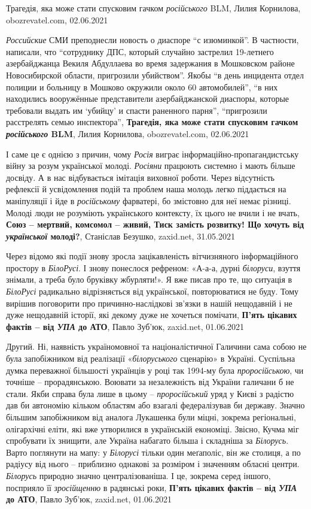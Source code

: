 Трагедія, яка може стати спусковим гачком \emph{російського} BLM, Лилия Корнилова, obozrevatel.com, 02.06.2021

\emph{Российские} СМИ преподнесли новость о диаспоре \enquote{с изюминкой}. В
частности, написали, что \enquote{сотруднику ДПС, который случайно застрелил
19-летнего азербайджанца Векиля Абдуллаева во время задержания в Мошковском
районе Новосибирской области, пригрозили убийством}.  Якобы \enquote{в день
инцидента отдел полиции и больницу в Мошково окружили около 60 автомобилей},
\enquote{в них находились вооружённые представители азербайджанской диаспоры,
которые требовали выдать им \enquote{убийцу} и спасти раненного парня},
\enquote{пригрозили расстрелять семью инспектора},
\textbf{Трагедія, яка може стати спусковим гачком \emph{російського} BLM}, Лилия Корнилова, obozrevatel.com, 02.06.2021

І саме це є однією з причин, чому \emph{Росія} виграє інформаційно-пропагандистську
війну за розум української молоді. \emph{Росіяни} працюють системно і мають більше
досвіду. А в нас відбувається імітація виховної роботи. Через відсутність
рефлексії й усвідомлення подій та проблем наша молодь легко піддається на
маніпуляції і йде в \emph{російському} фарватері, бо змістовно для неї немає різниці.
Молоді люди не розуміють українського контексту, їх цього не вчили і не вчать,
\textbf{Союз – мертвий, комсомол – живий, Тиск замість розвитку! Що хочуть від \emph{української} молоді?},
Станіслав Безушко, zaxid.net, 31.05.2021

Через відомо які події знову зросла зацікавленість вітчизняного інформаційного
простору в \emph{БілоРусі}. І знову понеслося рефреном: «А-а-а, дурні
\emph{білоруси}, взуття знімали, а треба було бруківку жбурляти!». Я вже писав
про те, що ситуація в \emph{БілоРусі} радикально відрізняється від української,
повторюватися не буду. Тому вирішив поговорити про причинно-наслідкові зв'язки
в нашій нещодавній і не дуже нещодавній історії, які декому дуже не хочеться
помічати, 
\textbf{П'ять цікавих фактів – від \emph{УПА} до АТО}, Павло Зуб'юк, zaxid.net, 01.06.2021

Другий. Ні, наявність україномовної та націоналістичної Галичини сама собою не
була запобіжником від реалізації «\emph{білоруського} сценарію» в Україні. Суспільна
думка переважної більшості українців у році так 1994-му була \emph{проросійською}, чи
точніше – прорадянською. Воювати за незалежність від України галичани б не
стали. Якби справа була лише в цьому – \emph{проросійський} уряд у Києві з радістю дав
би автономію кільком областям або взагалі федералізував би державу. Значно
більшим запобіжником від аналога Лукашенка були міцні, зокрема регіональні,
олігархічні еліти, які вже утворилися в українській економіці. Звісно, Кучма
міг спробувати їх знищити, але Україна набагато більша і складніша за \emph{Білорусь}.
Варто поглянути на мапу: у \emph{Білорусі} тільки один меґаполіс, він же столиця, а по
радіусу від нього – приблизно однакові за розміром і значенням обласні центри.
\emph{Білорусь} природно значно централізованіша. І це, зокрема серед іншого,
посприяло її \emph{зросійщенню} в радянські роки, 
\textbf{П'ять цікавих фактів – від \emph{УПА} до АТО}, Павло Зуб'юк, zaxid.net, 01.06.2021

